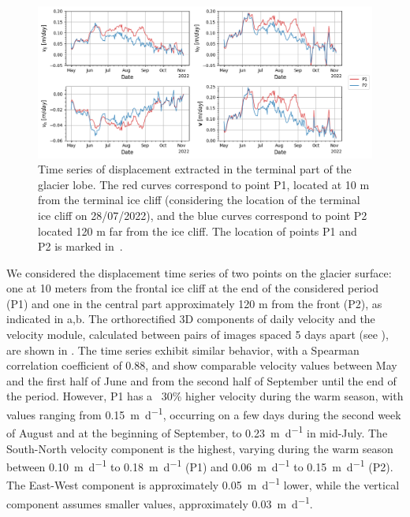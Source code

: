 \begin{figure}[ht]
  \includegraphics[width=\textwidth]{4_ts_velocities.png}
  \caption{Time series of displacement extracted in the terminal part of the glacier
    lobe. The red curves correspond to point P1, located at 10 m from the terminal ice cliff (considering the location of the terminal ice cliff on 28/07/2022), and the blue curves correspond to point P2 located 120 m far from the ice
    cliff. The location of points P1 and P2 is marked in~.}
  \label{fig:4:velocity_ts}
\end{figure}

We considered the displacement time series of two points on the glacier surface: one at
10 meters from the frontal ice cliff at the end of the considered period (P1) and one in
the central part approximately 120 m from the front (P2), as indicated in
a,b.
The orthorectified 3D components of daily velocity and the velocity module, calculated
between pairs of images spaced 5 days apart (see ), are shown in
.
The time series exhibit similar behavior, with a Spearman correlation coefficient
of 0.88, and show comparable velocity values between May and the first half of June and
from the second half of September until the end of the period.
However, P1 has a ~30\% higher velocity during the warm season, with values ranging from
\SI{0.15}{\meter\per\day}, occurring on a few days during the second week of August and
at the beginning of September, to \SI{0.23}{\meter\per\day} in mid-July.
The South-North velocity component is the highest, varying during the warm season between
\SI{0.10}{\meter\per\day} to \SI{0.18}{\meter\per\day} (P1) and \SI{0.06}{\meter\per\day}
to \SI{0.15}{\meter\per\day} (P2).
The East-West component is approximately \SI{0.05}{\meter\per\day} lower, while the
vertical component assumes smaller values, approximately \SI{0.03}{\meter\per\day}.

